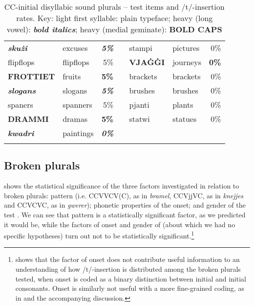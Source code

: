 \documentclass[output=paper]{langsci/langscibook}
\begin{document}
\begin{table}
\begin{tabularx}{\textwidth}{llr X llr}
\textbf{\textit{skużi}} & excuses & \textbf{\textit{5\%}} &  & stampi & pictures & 0\%\\
flipflops & flipflops & 5\% &  & \textbf{VJA\.G\.GI} & journeys & \textbf{0\%}\\
\textbf{FROTTIET} & fruits & \textbf{5\%} &  & brackets & brackets & 0\%\\
\textbf{\textit{slogans}} & slogans & \textbf{\textit{5\%}} &  & brushes & brushes & 0\%\\
spaners & spanners & 5\% &  & pjanti & plants & 0\%\\
\textbf{DRAMMI} & dramas & \textbf{5\%} &  & statwi & statues & 0\%\\
\textbf{\textit{kwadri}} & paintings & \textbf{\textit{0\%}} &  &  &  & \\
\lspbottomrule
\end{tabularx}
\caption{
CC-initial  {disyllabic} sound plurals – test items and /t/-insertion rates. Key: light first  {syllable}: plain typeface; 
heavy (long  {vowel}): \textbf{\textit{bold italics}}; heavy (medial  {geminate}): \textbf{BOLD CAPS}}
\label{tab:lucas:10}
\end{table}

\subsection{Broken plurals}
 shows the statistical significance of the three factors investigated in relation to broken plurals: pattern (i.e. CCVVCV(C), as in \textit{bramel}, CCVjjVC, as in \textit{knejjes} and CCVCVC, as in \textit{gwerer}); phonetic properties of the onset; and gender of the test . We can see that pattern is a statistically significant factor, as we predicted it would be, while the factors of onset and gender of  (about which we had no specific hypotheses) turn out not to be statistically significant.\footnote{ shows that the factor of onset does not contribute useful information to an understanding of how /t/-insertion is distributed among the broken plurals tested, when onset is coded as a binary distinction between initial  and initial  consonants. Onset is similarly not useful with a more fine-grained coding, as in  and the accompanying discussion.}
\end{document}
